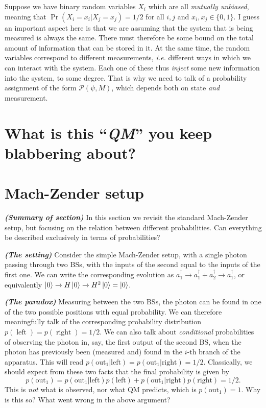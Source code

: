 \documentclass[a4paper]{report}
\newcommand{\on}[1]{\operatorname{#1}}
\newcommand{\calP}{{\mathcal{P}}}
\newcommand{\heading}[1]{\textbf{\color{orange}\textit{(#1)}}}
\begin{document}
Suppose we have binary random variables $X_i$ which are all \emph{mutually unbiased}, meaning that $\Pr(X_i=x_i|X_j=x_j)=1/2$ for all $i,j$ and $x_i,x_j\in\{0,1\}$. I guess an important aspect here is that we are assuming that the system that is being measured is always the same. There must therefore be some bound on the total amount of information that can be stored in it.
At the same time, the random variables correspond to different measurements, \emph{i.e.} different ways in which we can interact with the system. Each one of these thus \emph{inject} some new information into the system, to some degree.
That is why we need to talk of a probability assignment of the form $\calP(\psi,M)$, which depends both on state \emph{and} measurement.

\section{What is this ``\emph{QM}'' you keep blabbering about?}

\section{Mach-Zender setup}

\heading{Summary of section}
In this section we revisit the standard Mach-Zender setup, but focusing on the relation between different probabilities.
Can everything be described exclusively in terms of probabilities?

\heading{The setting}
Consider the simple Mach-Zender setup, with a single photon passing through two BSs, with the inputs of the second equal to the inputs of the first one. We can write the corresponding evolution as
$a_1^\dagger\to a_1^\dagger + a_2^\dagger \to a_1^\dagger$, or equivalently $\ket0\to H\ket0\to H^2\ket0=\ket0$.

\heading{The paradox}
Measuring between the two BSs, the photon can be found in one of the two possible positions with equal probability. We can therefore meaningfully talk of the corresponding probability distribution $p(\on{left})=p(\on{right})=1/2$.
We can also talk about \emph{conditional} probabilities of observing the photon in, say, the first output of the second BS, when the photon has previously been (measured and) found in the $i$-th branch of the apparatus.
This will read $p(\text{out}_1|\text{left})=p(\text{out}_1|\text{right})=1/2$.
Classically, we should expect from these two facts that the final probability is given by
\begin{equation}
	p(\text{out}_1) =
	p(\text{out}_1|\text{left}) p(\text{left})
	+ p(\text{out}_1|\text{right}) p(\text{right}) = 1/2.
	\label{MZ:eq:conditional_probabilities_classical_law}
\end{equation}
This is \emph{not} what is observed, nor what QM predicts, which is $p(\text{out}_1)=1$.
Why is this so? What went wrong in the above argument?
\end{document}
